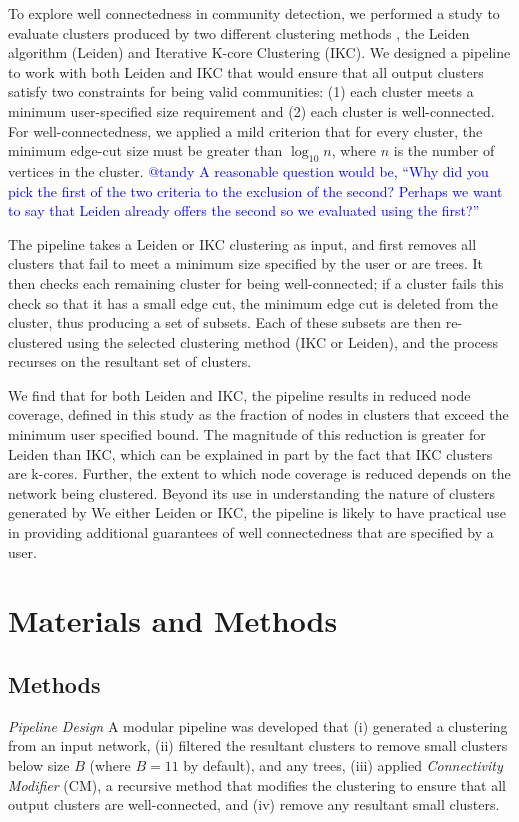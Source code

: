 \documentclass[12pt, oneside]{article}   	%
\begin{document}
To explore well connectedness in community detection, we performed a study to evaluate  clusters produced by two different clustering methods \citep{Traag_2019,Wedell2022}, the Leiden algorithm (Leiden) and Iterative K-core Clustering (IKC). We designed a pipeline to work with both Leiden and IKC that would ensure that all output clusters satisfy two constraints for being valid communities: (1) each cluster meets a minimum user-specified size requirement
and (2) each cluster is well-connected. For well-connectedness, we applied a mild criterion that for every cluster, the minimum edge-cut size must be greater than $\log_{10}n$, where $n$ is the number of vertices in the cluster. \textcolor{blue}{@tandy A reasonable question would be, ``Why did you pick the first of the two criteria to the exclusion of the second? Perhaps we want to say that Leiden already offers the second so we evaluated using the first?''}

The pipeline takes a Leiden or IKC clustering as input, and first removes all clusters that fail to meet a minimum size specified by the user or are trees. It then checks each remaining cluster for being well-connected; if a cluster fails this check so that it has a small edge cut, the minimum edge cut is deleted from the cluster, thus producing a set of subsets.  Each of these subsets are then re-clustered using the selected clustering method (IKC or Leiden), and the process recurses on the resultant set of clusters.

We find that for both Leiden and IKC, the pipeline results in reduced node coverage, defined in this study as the fraction of nodes in clusters that exceed the minimum user specified bound. The magnitude of this reduction is greater for Leiden than IKC, which can be explained in part by the fact that IKC clusters are k-cores. Further, the extent to which node coverage is reduced depends on the network being clustered. Beyond its use in understanding the nature of clusters generated by We either Leiden or IKC, the pipeline is likely to have practical use in providing additional guarantees of well connectedness that are specified by a user. 

\section{Materials and Methods}

\subsection{Methods} 
\emph{Pipeline Design} A modular pipeline was developed that (i) generated a clustering from an input network, (ii) filtered the resultant clusters to remove small clusters below size $B$ (where $B=11$ by default), and any trees, (iii) applied \emph{Connectivity Modifier} (CM), a recursive  method that modifies the clustering to ensure that all output clusters are well-connected, and (iv) remove any resultant small clusters.
\end{document}
